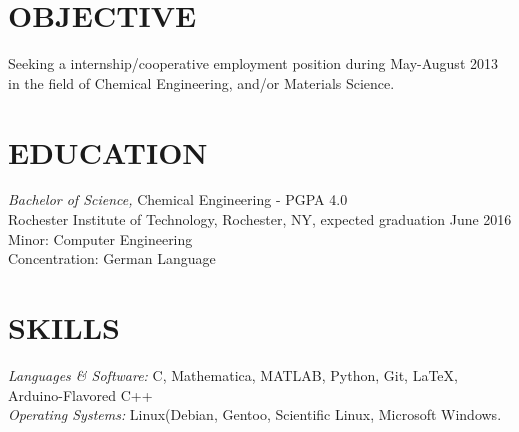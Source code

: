\documentclass[line,margin]{res}
\begin{document}
\address{3241 Nathaniel Rochester Hall, Rochester, NY 14623}
\address{(315) 391-7268 - tmw4661@rit.edu}

\begin{resume}
 
\section{OBJECTIVE}       Seeking a internship/cooperative employment position during May-August
						  2013 in the field of Chemical Engineering, and/or
						  Materials Science.
 
\section{EDUCATION} {\sl Bachelor of Science,} Chemical Engineering - PGPA 4.0 \\
                Rochester Institute of Technology, Rochester, NY, 
                expected graduation June 2016 \\
                Minor: Computer Engineering \\
                Concentration: German Language \\
\section{SKILLS} {\sl Languages \& Software:} C, Mathematica,
						MATLAB, Python, Git, \LaTeX, Arduino-Flavored C++\\
                {\sl Operating Systems:} Linux(Debian, Gentoo, Scientific Linux, Microsoft Windows.


\end{resume}
\end{document}
